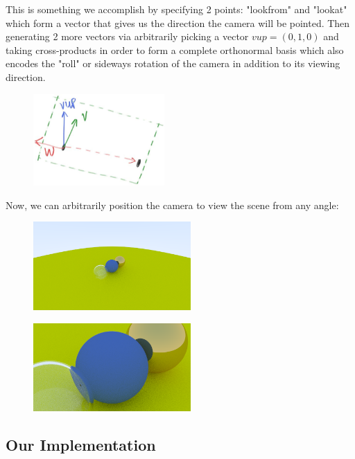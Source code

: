 \documentclass[conference]{IEEEtran}
\begin{document}
This is something we accomplish by specifying 2 points: "lookfrom" and "lookat" which form a vector that gives us the direction the camera will be pointed. Then generating 2 more vectors via arbitrarily picking a vector $vup = (0,1,0)$ and taking cross-products in order to form a complete orthonormal basis which also encodes the "roll" or sideways rotation of the camera in addition to its viewing direction.

\begin{figure}[h]
\includegraphics[width=5cm]{images/camera2.png}\\
\centering
\end{figure}

Now, we can arbitrarily position the camera to view the scene from any angle:

\begin{figure}[H]
\includegraphics[width=6cm]{images/camera3.png}
\centering
\end{figure}

\begin{figure}[H]
\includegraphics[width=6cm]{images/camera4.png}
\centering
\end{figure}

\subsection{Our Implementation}
\end{document}
